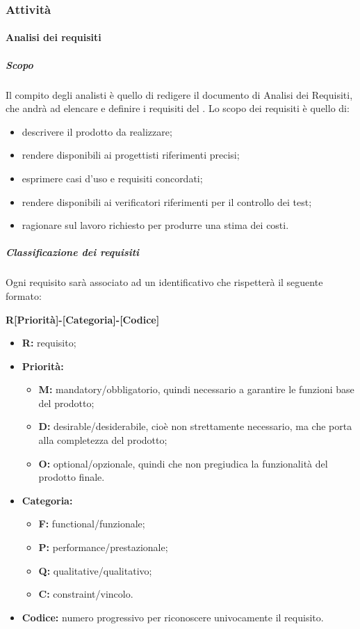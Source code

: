 \documentclass[]{article}
\begin{document}
				\subsubsection{Attività}
				
					\paragraph{Analisi dei requisiti}
						\subparagraph{Scopo}
						Il compito degli analisti è quello di redigere il documento di Analisi dei Requisiti, che andrà ad elencare e definire i requisiti del . Lo scopo dei requisiti è quello di:
						\begin{itemize}
							\item descrivere il prodotto da realizzare;
							\item rendere disponibili ai progettisti riferimenti precisi;
							\item esprimere casi d'uso e requisiti concordati;
							\item rendere disponibili ai verificatori riferimenti per il controllo dei test;
							\item ragionare sul lavoro richiesto per produrre una stima dei costi.
						\end{itemize}
						\subparagraph{Classificazione dei requisiti}
						Ogni requisito sarà associato ad un identificativo che rispetterà il seguente formato:
						\begin{center}
							\textbf{R[Priorità]-[Categoria]-[Codice]}
						\end{center}
						\begin{itemize}
							\item \textbf{R:} requisito;
							\item \textbf{Priorità:}
								\begin{itemize}
									\item \textbf{M:} mandatory/obbligatorio, quindi necessario a garantire le funzioni base del prodotto;
									\item \textbf{D:} desirable/desiderabile, cioè non strettamente necessario, ma che porta alla completezza del prodotto;
									\item \textbf{O:} optional/opzionale, quindi che non pregiudica la funzionalità del prodotto finale.
								\end{itemize}
							\item \textbf{Categoria:}
								\begin{itemize}
									\item \textbf{F:} functional/funzionale;
									\item \textbf{P:} performance/prestazionale;
									\item \textbf{Q:} qualitative/qualitativo;
									\item \textbf{C:} constraint/vincolo.
								\end{itemize}
							\item \textbf{Codice:} numero progressivo per riconoscere univocamente il requisito.
						\end{itemize}
\end{document}
